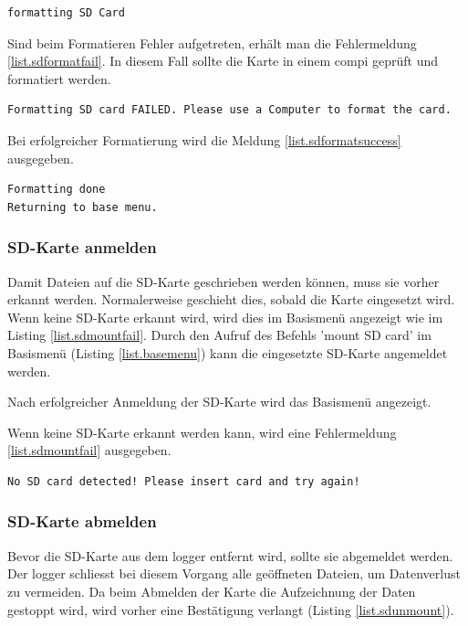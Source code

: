 \begin{lstlisting}[caption=Statusmeldung SD formatieren, label=list.sdformatting]
formatting SD Card
\end{lstlisting}

Sind beim Formatieren Fehler aufgetreten, erhält man die Fehlermeldung \ref{list.sdformatfail}. In diesem Fall sollte die Karte in einem \gls{compi} geprüft und formatiert werden.

\begin{lstlisting}[caption=Fehlermeldung SD formatieren, label=list.sdformatfail]
Formatting SD card FAILED. Please use a Computer to format the card.
\end{lstlisting}

Bei erfolgreicher Formatierung wird die Meldung \ref{list.sdformatsuccess} ausgegeben. 

\begin{lstlisting}[caption=Erfolgsmeldung SD formatieren, label=list.sdformatsuccess]
Formatting done
Returning to base menu.
\end{lstlisting}


\subsubsection{SD-Karte anmelden}\label{sssec.sdmount}
Damit Dateien auf die SD-Karte geschrieben werden können, muss sie vorher erkannt werden. Normalerweise geschieht dies, sobald die Karte eingesetzt wird. Wenn keine SD-Karte erkannt wird, wird dies im Basismenü angezeigt wie im Listing \ref{list.sdmountfail}. Durch den Aufruf des Befehls 'mount SD card' im Basismenü (Listing \ref{list.basemenu}) kann die eingesetzte SD-Karte angemeldet werden.

Nach erfolgreicher Anmeldung der SD-Karte wird das Basismenü angezeigt. 

Wenn keine SD-Karte erkannt werden kann, wird eine Fehlermeldung \ref{list.sdmountfail} ausgegeben.

\begin{lstlisting}[caption=Fehlermeldung SD-Karte anmelden, label=list.sdmountfail]
No SD card detected! Please insert card and try again!
\end{lstlisting}


\subsubsection{SD-Karte abmelden}\label{sssec.sdunmount}
Bevor die SD-Karte aus dem \gls{logger} entfernt wird, sollte sie abgemeldet werden. Der \gls{logger} schliesst bei diesem Vorgang alle geöffneten Dateien, um Datenverlust zu vermeiden. Da beim Abmelden der Karte die Aufzeichnung der Daten gestoppt wird, wird vorher eine Bestätigung verlangt (Listing \ref{list.sdunmount}).

